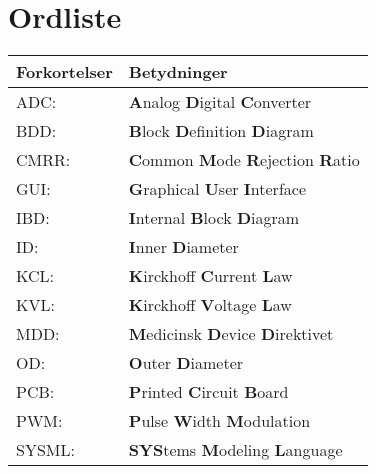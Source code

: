 \section*{Ordliste}
\begin{center}
		\begin{longtable}{ | m{6.5cm} | m{6.5cm}| } 
				\hline
			\textbf{Forkortelser} &\textbf{Betydninger} \\ 
			\hline	
			ADC: & \textbf{A}nalog \textbf{D}igital \textbf{C}onverter  \\ 
							
			\hline
			BDD: & \textbf{B}lock \textbf{D}efinition \textbf{D}iagram \\
\hline
			CMRR: & \textbf{C}ommon \textbf{M}ode \textbf{R}ejection \textbf{R}atio \\ 			
			\hline
			GUI: & \textbf{G}raphical \textbf{U}ser \textbf{I}nterface \\
			\hline
			
			IBD: & \textbf{I}nternal \textbf{B}lock \textbf{D}iagram \\  
\hline

			ID: & \textbf{I}nner \textbf{D}iameter \\ \hline
			KCL: & \textbf{K}irckhoff \textbf{C}urrent \textbf{L}aw \\ 
			\hline
			KVL: & \textbf{K}irckhoff \textbf{V}oltage \textbf{L}aw \\ 			
			\hline
			MDD: & \textbf{M}edicinsk \textbf{D}evice \textbf{D}irektivet \\ 			
			\hline
			
			OD: & \textbf{O}uter \textbf{D}iameter \\\hline
			PCB: & \textbf{P}rinted \textbf{C}ircuit \textbf{B}oard \\ 			
			 
			\hline
			PWM: & \textbf{P}ulse \textbf{W}idth \textbf{M}odulation \\ 
			
			\hline
			SYSML: & \textbf{SYS}tems \textbf{M}odeling \textbf{L}anguage \\ 
			
			
			
			
			
			\hline
		\end{longtable}
\end{center}